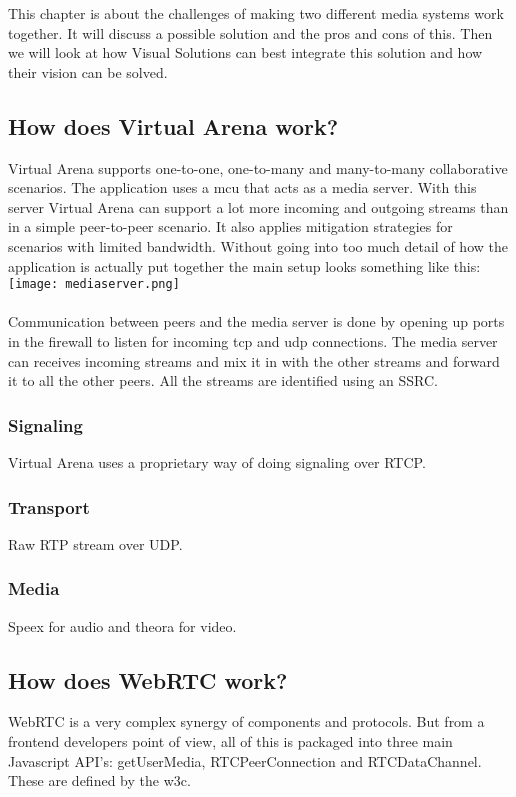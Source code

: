 
This chapter is about the challenges of making two different media systems work together. It will discuss a possible solution and the pros and cons of this. Then we will look at how Visual Solutions can best integrate this solution and how their vision can be solved.

\subsection{How does Virtual Arena work?}

Virtual Arena supports one-to-one, one-to-many and many-to-many collaborative scenarios. The application uses a \gls{mcu} that acts as a media server. With this server Virtual Arena can support a lot more incoming and outgoing streams than in a simple peer-to-peer scenario. It also applies mitigation strategies for scenarios with limited bandwidth. Without going into too much detail of how the application is actually put together the main setup looks something like this: 
\\
\texttt{[image: mediaserver.png]}
\\
\\
Communication between peers and the media server is done by opening up ports in the firewall to listen for incoming tcp and udp connections. The media server can receives incoming streams and mix it in with the other streams and forward it to all the other peers. All the streams are identified using an SSRC.

\subsubsection{Signaling}
Virtual Arena uses a proprietary way of doing signaling over RTCP.

\subsubsection{Transport}
Raw RTP stream over UDP.

\subsubsection{Media}
Speex for audio and theora for video.


\subsection{How does WebRTC work?}
WebRTC is a very complex synergy of components and protocols. But from a frontend developers point of view, all of this is packaged into three main Javascript API's: getUserMedia, RTCPeerConnection and RTCDataChannel. These are defined by the \gls{w3c}. 

